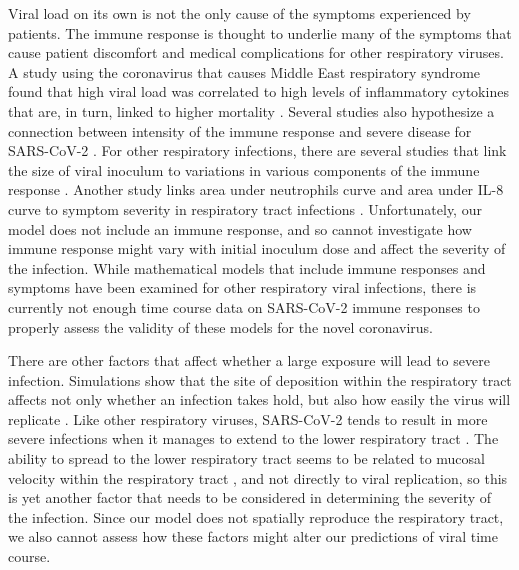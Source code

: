 Viral load on its own is not the only cause of the symptoms experienced by patients. The immune response is thought to underlie many of the symptoms that cause patient discomfort \citep{hijano19} and medical complications \citep{xu19} for other respiratory viruses. A study using the coronavirus that causes Middle East respiratory syndrome found that high viral load was correlated to high levels of inflammatory cytokines that are, in turn, linked to higher mortality \citep{alosaimi20}. Several studies also hypothesize a connection between intensity of the immune response and severe disease for SARS-CoV-2 \citep{lin20,cao20path,zhu20cardio}. For other respiratory infections, there are several studies that link the size of viral inoculum to variations in various components of the immune response \citep{go19, littwitz17, handel18, redeker14, anderson10}. Another study links area under neutrophils curve and area under IL-8 curve to symptom severity in respiratory tract infections \citep{henriquez15}. Unfortunately, our model does not include an immune response, and so cannot investigate how immune response might vary with initial inoculum dose and affect the severity of the infection. While mathematical models that include immune responses \citep{dobrovolny13} and symptoms \citep{canini11,price15} have been examined for other respiratory viral infections, there is currently not enough time course data on SARS-CoV-2 immune responses to properly assess the validity of these models for the novel coronavirus.  

There are other factors that affect whether a large exposure will lead to severe infection. Simulations show that the site of deposition within the respiratory tract affects not only whether an infection takes hold, but also how easily the virus will replicate \citep{haghnegahdar19}. Like other respiratory viruses, SARS-CoV-2 tends to result in more severe infections when it manages to extend to the lower respiratory tract \citep{COVID20}. The ability to spread to the lower respiratory tract seems to be related to mucosal velocity within the respiratory tract \citep{gonzalez19,quirouette20}, and not directly to viral replication, so this is yet another factor that needs to be considered in determining the severity of the infection. Since our model does not spatially reproduce the respiratory tract, we also cannot assess how these factors might alter our predictions of viral time course.

